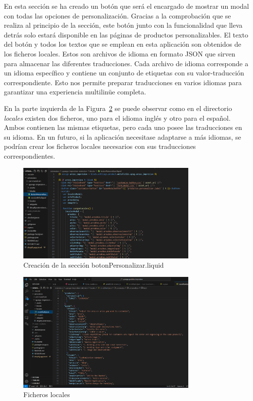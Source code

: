 \documentclass[11pt]{article}
\begin{document}
En esta sección se ha creado un botón que será el encargado de mostrar un modal con todas las opciones de personalización. Gracias a la comprobación
que se realiza al principio de la sección, este botón junto con la funcionalidad que lleva detrás solo estará disponible en las páginas de productos personalizables.
El texto del botón y todos los textos que se emplean en esta aplicación son obtenidos de los ficheros locales. Estos son archivos de idioma en formato 
JSON que sirven para almacenar las diferentes traducciones. Cada archivo de idioma corresponde a un idioma específico y contiene un conjunto de etiquetas con su valor-traducción correspondiente. Esto nos 
permite preparar traducciones en varios idiomas para garantizar una experiencia multilinüe completa.

En la parte izquierda de la Figura~\ref{fig:locales} se puede observar como en el directorio \textit{locales} existen dos ficheros, uno para el idioma inglés y otro para el español. 
Ambos contienen las mismas etiquetas, pero cada uno posee las traducciones en su idioma. En un futuro, si la aplicación necesitase adaptarse a más idiomas, se podrían crear los ficheros locales
necesarios con sus traducciones correspondientes.


\begin{figure}[H]
    \centering
    \includegraphics[width=0.8\textwidth]{imagenesUS1/seccionPersonalizarBoton.png}
    \caption{\label{fig:creacionSeccion}Creación de la sección botonPersonalizar.liquid}
    \vspace{\fill}
\end{figure}

\begin{figure}[H]
    \centering
    \includegraphics[width=0.8\textwidth]{imagenesUS1/locales.png}
    \caption{\label{fig:locales}Ficheros locales}
    \vspace{\fill}
\end{figure}
\end{document}
